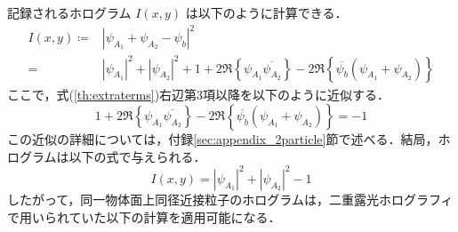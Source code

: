 記録されるホログラム $I(x,y)$ は以下のように計算できる．
\begin{align}
    I(x,y) \coloneqq& \left|\psi_{A_1} + \psi_{A_2} - \psi_b \right|^2 \\
    \label{th:extraterms}
    =& |\psi_{A_1}|^2 + |\psi_{A_2}|^2 + 1 + 2\Re \left\{ \psi_{A_1} \overline{\psi_{A_2}} \right\} - 2\Re \left\{\overline{\psi_b}\left( \psi_{A_1} + \psi_{A_2} \right)\right\}
\end{align}
ここで，式(\ref{th:extraterms})右辺第3項以降を以下のように近似する．
\begin{equation}
    \label{th:extratermsApprox}
    1 + 2\Re \left\{ \psi_{A_1} \overline{\psi_{A_2}} \right\} - 2\Re \left\{\overline{\psi_b}\left( \psi_{A_1} + \psi_{A_2} \right)\right\} = -1
\end{equation}
この近似の詳細については，付録\ref{sec:appendix_2particle}節で述べる．結局，ホログラムは以下の式で与えられる．
\begin{equation}
    \label{th:2particleHologram}
    I(x,y) = |\psi_{A_1}|^2 + |\psi_{A_2}|^2 -1
\end{equation}
したがって，同一物体面上同径近接粒子のホログラムは，二重露光ホログラフィで用いられていた以下の計算を適用可能になる\cite{doubleexposure}．

